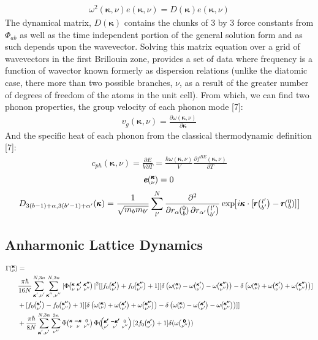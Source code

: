 \begin{align*}
	\omega^2(\pmb{\kappa},\nu) e(\pmb{\kappa},\nu)=D(\pmb{\kappa})e(\pmb{\kappa},\nu) 
\end{align*}
The dynamical matrix, $D(\pmb{\kappa})$ contains the chunks of 3 by 3 force constants from $\Phi_{ab}$ as well as the time independent portion of the general solution form and as such depends upon the wavevector. Solving this matrix equation over a grid of wavevectors in the first Brillouin zone, provides a set of data where frequency is a function of wavector known formerly as dispersion relations (unlike the diatomic case, there more than two possible branches, $\nu$, as a result of the greater number of degrees of freedom of the atoms in the unit cell). From which, we can find two phonon properties, the group velocity of each phonon mode [7]:
\begin{align*}
v_g(\pmb{\kappa}, \nu)=\frac{\partial \omega(\pmb{\kappa},\nu)}{\partial \pmb{\kappa}}
\end{align*}
And the specific heat of each phonon from the classical thermodynamic definition [7]:  
\begin{align*}
c_{ph}(\pmb{\kappa},\nu)=\frac{\partial E}{V\partial T}=\frac{\hbar\omega(\pmb{\kappa},\nu)}{V}\frac{\partial f^{BE}(\pmb{\kappa}, \nu)}{\partial T}	
\end{align*}
%
\begin{equation}
[D(\pmb{\kappa})-I\omega^2\kv]\pmb{e}\kv = 0
\end{equation}
%
\begin{equation}
D_{3(b-1)+\alpha,3(b'-1)+\alpha'}(\pmb{\kappa})=\frac{1}{\sqrt{m_bm_{b'}}}\sum_{l'}^N\frac{\partial^2}{\partial r_\alpha \Ob \partial r_{\alpha'} \lbp} \EXP{i\pmb{\kappa}\cdot [\pmb{r}\lbp-\pmb{r}\Ob]}
\end{equation}

\subsection{Anharmonic Lattice Dynamics}

\begin{equation}
\begin{split}
\Gamma \kv &= \\
&\frac{\pi\hbar}{16N}\SUM[']\SUM['']|\Phi\kvkvpkvpp|^2[[f_0\kvp+f_0\kvpp+1][\delta\left(\omega\kv-\omega\kvp-\omega\kvpp\right)-\delta\left(\omega\kv+\omega\kvp+\omega\kvpp\right)]\\
&+[f_0\kvp-f_0\kvpp+1][\delta\left(\omega\kv+\omega\kvp+\omega\kvpp\right)-\delta\left(\omega\kv-\omega\kvp-\omega\kvpp\right)]]\\
&+\frac{\pi\hbar}{8N}\SUM[']\sum_{\nu''}^{3n}\Phi\kvOv\Phi(\kvpOv[2f_0\kvp+1]\delta(\omega\Ovpp)
\end{split}
\end{equation}

